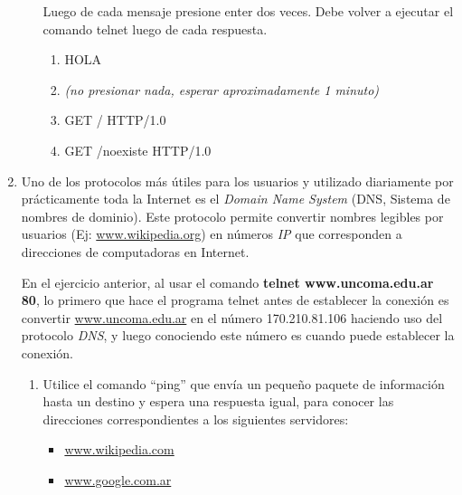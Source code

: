 \documentclass[12pt]{article}
\begin{document}
\begin{enumerate}
\begin{enumerate}
            Luego de cada mensaje presione enter dos veces. Debe volver a
            ejecutar el comando telnet luego de cada respuesta.

        \begin{enumerate}

            \item HOLA

            \item \emph{(no presionar nada, esperar aproximadamente 1 minuto)}

            \item GET / HTTP/1.0

            \item GET /noexiste HTTP/1.0

        \end{enumerate}

    \end{enumerate}

    \item Uno de los protocolos más útiles para los usuarios y utilizado
        diariamente por prácticamente toda la Internet es el \emph{Domain Name
        System} (DNS, Sistema de nombres de dominio). Este protocolo permite
        convertir nombres legibles por usuarios (Ej: \url{www.wikipedia.org})
        en números \emph{IP} que corresponden a direcciones de computadoras en
        Internet.

        En el ejercicio anterior, al usar el comando \textbf{telnet
        www.uncoma.edu.ar 80}, lo primero que hace el programa telnet antes de
        establecer la conexión es convertir \url{www.uncoma.edu.ar} en el
        número 170.210.81.106 haciendo uso del protocolo \emph{DNS}, y luego
        conociendo este número es cuando puede establecer la conexión.

        \begin{enumerate}

            \item Utilice el comando ``ping'' que envía un pequeño paquete de
                información hasta un destino y espera una respuesta igual,
                para conocer las direcciones correspondientes a los siguientes
                servidores:

            \begin{itemize}

                \item \url{www.wikipedia.com}

                \item \url{www.google.com.ar}


\end{itemize}
\end{enumerate}
\end{enumerate}
\end{document}
